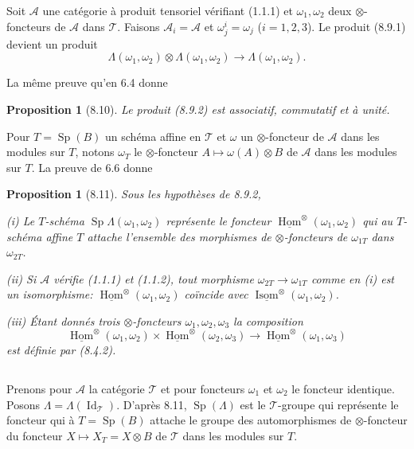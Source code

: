 \documentclass[12pt,a4paper]{article}
\theoremstyle{plain}
\newtheorem{proposition}[theorem]{Proposition}
\theoremstyle{definition}
\DeclareMathOperator{\Sp}{Sp}
\DeclareMathOperator{\Hom}{Hom}
\DeclareMathOperator{\Isom}{Isom}
\DeclareMathOperator{\Id}{Id}
\begin{document}
Soit $\mathcal{A}$ une catégorie à produit tensoriel vérifiant (1.1.1) et $\omega_1, \omega_2$ deux $\otimes$-foncteurs de $\mathcal{A}$ dans $\mathcal{T}$. Faisons $\mathcal{A}_i = \mathcal{A}$ et $\omega_j^i = \omega_j$ ($i = 1, 2, 3$). Le produit (8.9.1) devient un produit
\begin{equation}\label{eq:8.9.2}
\Lambda(\omega_1, \omega_2) \otimes \Lambda(\omega_1, \omega_2) \to \Lambda(\omega_1, \omega_2).
\end{equation}

La même preuve qu'en 6.4 donne
\begin{proposition}[8.10]
Le produit (8.9.2) est associatif, commutatif et à unité.
\end{proposition}

Pour $T = \Sp(B)$ un schéma affine en $\mathcal{T}$ et $\omega$ un $\otimes$-foncteur de $\mathcal{A}$ dans les modules sur $T$, notons $\omega_T$ le $\otimes$-foncteur $A \mapsto \omega(A) \otimes B$ de $\mathcal{A}$ dans les modules sur $T$.
La preuve de 6.6 donne
\begin{proposition}[8.11]
Sous les hypothèses de 8.9.2,

\textup{(i)} Le $T$-schéma $\Sp \Lambda(\omega_1, \omega_2)$ représente le foncteur $\underline{\Hom}^\otimes(\omega_1, \omega_2)$ qui au $T$-schéma affine $T$ attache l'ensemble des morphismes de $\otimes$-foncteurs de $\omega_{1T}$ dans $\omega_{2T}$.

\textup{(ii)} Si $\mathcal{A}$ vérifie (1.1.1) et (1.1.2), tout morphisme $\omega_{2T} \to \omega_{1T}$ comme en (i) est un isomorphisme: $\underline{\Hom}^\otimes(\omega_1, \omega_2)$ coïncide avec $\underline{\Isom}^\otimes(\omega_1, \omega_2)$.

\textup{(iii)} Étant donnés trois $\otimes$-foncteurs $\omega_1, \omega_2, \omega_3$ la composition
\[
\underline{\Hom}^\otimes(\omega_1, \omega_2) \times \underline{\Hom}^\otimes(\omega_2, \omega_3) \to \underline{\Hom}^\otimes(\omega_1, \omega_3)
\]
est définie par (8.4.2).
\end{proposition}

\subsection{}

Prenons pour $\mathcal{A}$ la catégorie $\mathcal{T}$ et pour foncteurs $\omega_1$ et $\omega_2$ le foncteur identique. Posons $\Lambda = \Lambda(\Id_\mathcal{T})$. D'après 8.11, $\Sp(\Lambda)$ est le $\mathcal{T}$-groupe qui représente le foncteur qui à $T = \Sp(B)$ attache le groupe des automorphismes de $\otimes$-foncteur du foncteur $X \mapsto X_T = X \otimes B$ de $\mathcal{T}$ dans les modules sur $T$.
\end{document}

